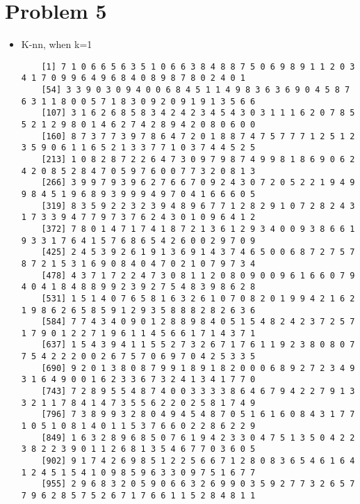 \documentclass{article}
\begin{document}
\section{Problem 5}
\begin{itemize}
	\item K-nn, when k=1\\
	\begin{scriptsize}

	
	
	\begin{verbatim}
	[1] 7 1 0 6 6 5 6 3 5 1 0 6 6 3 8 4 8 8 7 5 0 6 9 8 9 1 1 2 0 3 4 1 7 0 9 9 6 4 9 6 8 4 0 8 9 8 7 8 0 2 4 0 1
	[54] 3 3 9 0 3 0 9 4 0 0 6 8 4 5 1 1 4 9 8 3 6 3 6 9 0 4 5 8 7 6 3 1 1 8 0 0 5 7 1 8 3 0 9 2 0 9 1 9 1 3 5 6 6
	[107] 3 1 6 2 6 8 5 8 3 4 2 4 2 3 4 5 4 3 0 3 1 1 1 6 2 0 7 8 5 5 2 1 2 9 8 0 1 4 6 2 7 4 2 8 9 4 2 0 8 0 6 0 0
	[160] 8 7 3 7 7 3 9 7 8 6 4 7 2 0 1 8 8 7 4 7 5 7 7 7 1 2 5 1 2 3 5 9 0 6 1 1 6 5 2 1 3 3 7 7 1 0 3 7 4 4 5 2 5
	[213] 1 0 8 2 8 7 2 2 6 4 7 3 0 9 7 9 8 7 4 9 9 8 1 8 6 9 0 6 2 4 2 0 8 5 2 8 4 7 0 5 9 7 6 0 0 7 7 3 2 0 8 1 3
	[266] 3 9 9 7 9 3 9 6 2 7 6 6 7 0 9 2 4 3 0 7 2 0 5 2 2 1 9 4 9 9 8 4 5 1 9 6 8 9 3 9 9 9 4 9 7 0 4 1 6 6 6 0 5
	[319] 8 3 5 9 2 2 3 2 3 9 4 8 9 6 7 7 1 2 8 2 9 1 0 7 2 8 2 4 3 1 7 3 3 9 4 7 7 9 7 3 7 6 2 4 3 0 1 0 9 6 4 1 2
	[372] 7 8 0 1 4 7 1 7 4 1 8 7 2 1 3 6 1 2 9 3 4 0 0 9 3 8 6 6 1 9 3 3 1 7 6 4 1 5 7 6 8 6 5 4 2 6 0 0 2 9 7 0 9
	[425] 2 4 5 3 9 2 6 1 9 1 3 6 9 1 4 3 7 4 6 5 0 0 6 8 7 2 7 5 7 8 7 2 1 5 3 1 6 9 0 8 4 0 4 7 0 2 1 0 7 9 7 3 4
	[478] 4 3 7 1 7 2 2 4 7 3 0 8 1 1 2 0 8 0 9 0 0 9 6 1 6 6 0 7 9 4 0 4 1 8 4 8 8 9 9 2 3 9 2 7 5 4 8 3 9 8 6 2 8
	[531] 1 5 1 4 0 7 6 5 8 1 6 3 2 6 1 0 7 0 8 2 0 1 9 9 4 2 1 6 2 1 9 8 6 2 6 5 8 5 9 1 2 9 3 5 8 8 8 2 8 2 6 3 6
	[584] 7 7 4 3 4 0 9 0 1 2 8 8 9 8 4 0 5 1 5 4 8 2 4 2 3 7 2 5 7 1 7 9 0 1 2 2 7 1 9 6 1 1 4 5 6 6 1 7 1 4 3 7 1
	[637] 1 5 4 3 9 4 1 1 5 5 2 7 3 2 6 7 1 7 6 1 1 9 2 3 8 0 8 0 7 7 5 4 2 2 2 0 0 2 6 7 5 7 0 6 9 7 0 4 2 5 3 3 5
	[690] 9 2 0 1 3 8 0 8 7 9 9 1 8 9 1 8 2 0 0 0 6 8 9 2 7 2 3 4 9 3 1 6 4 9 0 0 1 6 2 3 3 6 7 3 2 4 1 3 4 1 7 7 0
	[743] 7 2 8 9 5 5 4 8 7 4 0 0 3 3 3 3 8 6 4 6 7 9 4 2 2 7 9 1 3 3 2 1 1 7 8 4 1 4 7 3 5 5 6 2 2 0 2 5 8 1 7 4 9
	[796] 7 3 8 9 9 3 2 8 0 4 9 4 5 4 8 7 0 5 1 6 1 6 0 8 4 3 1 7 7 1 0 5 1 0 8 1 4 0 1 1 5 3 7 6 6 0 2 2 8 6 2 2 9
	[849] 1 6 3 2 8 9 6 8 5 0 7 6 1 9 4 2 3 3 0 4 7 5 1 3 5 0 4 2 2 3 8 2 2 3 9 0 1 1 2 6 8 1 3 5 4 6 7 7 0 3 6 0 5
	[902] 9 1 7 4 2 6 9 8 5 1 2 2 5 6 6 7 1 2 8 0 8 3 6 5 4 6 1 6 4 1 2 4 5 1 5 4 1 0 9 8 5 9 6 3 3 0 9 7 5 1 6 7 7
	[955] 2 9 6 8 3 2 0 5 9 0 6 6 3 2 6 9 9 0 3 5 9 2 7 7 3 2 6 5 7 7 9 6 2 8 5 7 5 2 6 7 1 7 6 6 1 1 5 2 8 4 8 1 1

\end{verbatim}
\end{scriptsize}
\end{itemize}
\end{document}

